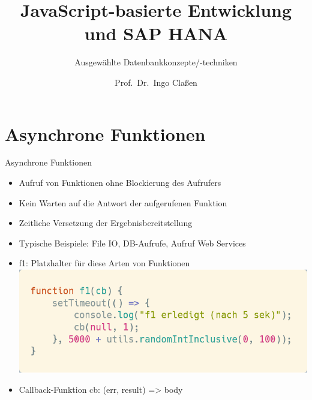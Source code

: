 \documentclass[t,handout]{beamer}
\title{JavaScript-basierte Entwicklung und SAP HANA}
\subtitle{Ausgewählte Datenbankkonzepte/-techniken}
\author[Ingo Claßen]{Prof.~Dr.~Ingo Claßen}
\institute[HTW Berlin]{Hochschule für Technik und Wirtschaft Berlin}
\date{}
\begin{document}

\begin{frame}[plain]
  \maketitle
  \vspace*{-1cm}
  \tableofcontents
\end{frame}

\section{Asynchrone Funktionen}
\begin{frame}{Asynchrone Funktionen}
  \begin{itemize}
    \item Aufruf von Funktionen ohne Blockierung des Aufrufers
    \item Kein Warten auf die Antwort der aufgerufenen Funktion
    \item Zeitliche Versetzung der Ergebnisbereitstellung
    \item Typische Beispiele: File IO, DB-Aufrufe, Aufruf Web Services
    \item f1: Platzhalter für diese Arten von Funktionen\\[.2cm]
          \includegraphics[scale=.28]{fig/async1.png}
    \item Callback-Funktion cb: (err, result) => body
  \end{itemize}
\end{frame}
\end{document}
